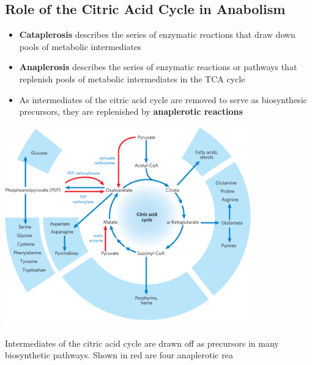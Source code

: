 \documentclass[10pt]{article}
\begin{document}
\subsection*{Role of the Citric Acid Cycle in Anabolism}
\begin{itemize}
	\item \textbf{Cataplerosis} describes the series of enzymatic reactions that draw down pools of metabolic intermediates
	\item \textbf{Anaplerosis} describes the series of enzymatic reactions or pathways that replenish pools of metabolic intermediates in the TCA cycle
	\item As intermediates of the citric acid cycle are removed to serve as biosynthesic precursors, they are replenished by \textbf{anaplerotic reactions}
\end{itemize}
\begin{center} 
    \includegraphics*[width=0.8\textwidth]{../Week 9/L4_23.png} 
\end{center}
Intermediates of the citric acid cycle are drawn off as precursors in many biosynthetic pathways.  Shown in red are four anaplerotic rea
\end{document}
